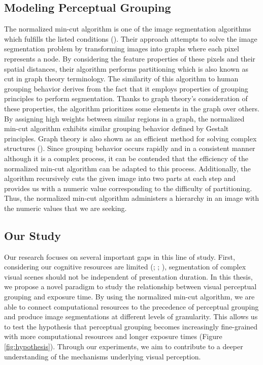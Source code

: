 \documentclass{article}
\begin{document}
\subsection{Modeling Perceptual Grouping}
The normalized min-cut algorithm is one of the image segmentation algorithms which fulfills the listed conditions (\cite{RN165}). Their approach attempts to solve the image segmentation problem by transforming images into graphs where each pixel represents a node. By considering the feature properties of these pixels and their spatial distances, their algorithm performs partitioning which is also known as cut in graph theory terminology. The similarity of this algorithm to human grouping behavior derives from the fact that it employs properties of grouping principles to perform segmentation. Thanks to graph theory's consideration of these properties, the algorithm prioritizes some elements in the graph over others. By assigning high weights between similar regions in a graph, the normalized min-cut algorithm exhibits similar grouping behavior defined by Gestalt principles. Graph theory is also shown as an efficient method for solving complex structures (\cite{newman2003structure}). Since grouping behavior occurs rapidly and in a consistent manner although it is a complex process, it can be contended that the efficiency of the normalized min-cut algorithm can be adapted to this process. Additionally, the algorithm recursively cuts the given image into two parts at each step and provides us with a numeric value corresponding to the difficulty of partitioning. Thus, the normalized min-cut algorithm administers a hierarchy in an image with the numeric values that we are seeking.

\subsection{Our Study}
Our research focuses on several important gaps in this line of study. First, considering our cognitive resources are limited (\cite{baddeley1974working}; \cite{hertwig2003coglimit}; \cite{phillips1977vismem}), segmentation of complex visual scenes should not be independent of presentation duration. In this thesis, we propose a novel paradigm to study the relationship between visual perceptual grouping and exposure time. By using the normalized min-cut algorithm, we are able to connect computational resources to the precedence of perceptual grouping and produce image segmentations at different levels of granularity. This allows us to test the hypothesis that perceptual grouping becomes increasingly fine-grained with more computational resources and longer exposure times (Figure \ref{fig:hypothesis}). Through our experiments, we aim to contribute to a deeper understanding of the mechanisms underlying visual perception. 
\end{document}
